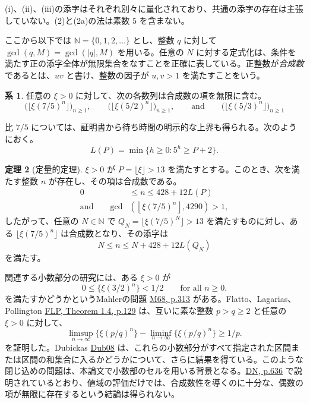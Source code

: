 \documentclass[11pt,reqno]{amsart}
\theoremstyle{definition}
\newtheorem{theorem}{定理}
\newtheorem{corollary}[theorem]{系}
\theoremstyle{definition}
\theoremstyle{remark}
\begin{document}
(i)、(ii)、(iii)の添字はそれぞれ別々に量化されており、共通の添字の存在は主張していない。(2)と(2a)の法は素数 \(5\) を含まない。

ここから以下では \(\mathbb N=\{0,1,2,\ldots\}\) とし、整数 \(q\) に対して \(\gcd(q,M)=\gcd(|q|,M)\) を用いる。任意の \(N\) に対する定式化は、条件を満たす正の添字全体が無限集合をなすことを正確に表している。正整数が\emph{合成数}であるとは、\(uv\) と書け、整数の因子が \(u,v>1\) を満たすことをいう。

\begin{samepage}
\begin{corollary}\leavevmode\label{thm:2}
任意の \(\xi>0\) に対して、次の各数列は合成数の項を無限に含む。
\[
\bigl(\lfloor\xi(7/5)^n\rfloor\bigr)_{n\ge1},\qquad \bigl(\lfloor\xi(5/2)^n\rfloor\bigr)_{n\ge1},\qquad \text{and}\qquad \bigl(\lfloor\xi(5/3)^n\rfloor\bigr)_{n\ge1}
\]
\label{thm-end:2}
\end{corollary}
\end{samepage}

比 \(7/5\) については、証明書から待ち時間の明示的な上界も得られる。次のようにおく。
\[
L(P)=\min\{h\ge0:5^h\ge P+2\}.
\]

\begin{samepage}
\begin{theorem}[定量的定理]\leavevmode\label{thm:3}
\(\xi>0\) が \(P=\lfloor\xi\rfloor>13\) を満たすとする。このとき、次を満たす整数 \(n\) が存在し、その項は合成数である。
\[
\begin{aligned}
0&\le n\le428+12L(P)\\
\text{and}\qquad
\gcd\!&\left(\left\lfloor\xi(7/5)^n\right\rfloor,4290\right)>1,
\end{aligned}
\tag{3}\label{eq:3}
\]
したがって、任意の \(N\in\mathbb N\) で \(Q_N=\lfloor\xi(7/5)^N\rfloor>13\) を満たすものに対し、ある \(\lfloor\xi(7/5)^n\rfloor\) は合成数となり、その添字は
\[
N\le n\le N+428+12L(Q_N)
\]
を満たす。
\label{thm-end:3}
\end{theorem}
\end{samepage}

関連する小数部分の研究には、ある \(\xi>0\) が
\[
0\le\{\xi(3/2)^n\}<1/2\qquad\text{for all }n\ge0.
\]
を満たすかどうかというMahlerの問題 \hyperref[ref-m68]{M68, p.313} がある。Flatto、Lagarias、Pollington \hyperref[ref-flp]{FLP, Theorem 1.4, p.129} は、互いに素な整数 \(p>q\ge2\) と任意の \(\xi>0\) に対して、
\[
\limsup_{n\to\infty}\{\xi(p/q)^n\}
-\liminf_{n\to\infty}\{\xi(p/q)^n\}\ge1/p.
\]
を証明した。Dubickas \hyperref[ref-dub08]{Dub08} は、これらの小数部分がすべて指定された区間または区間の和集合に入るかどうかについて、さらに結果を得ている。このような閉じ込めの問題は、本論文で小数部のセルを用いる背景となる。\hyperref[ref-dn]{DN, p.636} で説明されているとおり、値域の評価だけでは、合成数性を導くのに十分な、偶数の項が無限に存在するという結論は得られない。
\end{document}
